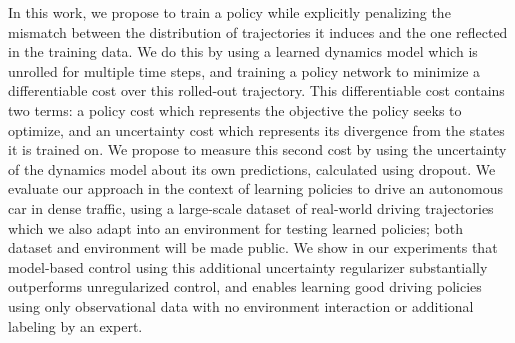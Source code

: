 \documentclass{article} %
\begin{document}
In this work, we propose to train a policy while explicitly penalizing the mismatch between the distribution of trajectories it induces and the one reflected in the training data.
We do this by using a learned dynamics model which is unrolled for multiple time steps, and training a policy network to minimize a differentiable cost over this rolled-out trajectory.
This differentiable cost contains two terms: a policy cost which represents the objective the policy seeks to optimize, and an uncertainty cost which represents its divergence from the states it is trained on. 
We propose to measure this second cost by using the uncertainty of the dynamics model about its own predictions, calculated using dropout.
We evaluate our approach in the context of learning policies to drive an autonomous car in dense traffic, using a large-scale dataset of real-world driving trajectories which we also adapt into an environment for testing learned policies; both dataset and environment will be made public.
We show in our experiments that model-based control using this additional uncertainty regularizer substantially outperforms unregularized control, and enables learning good driving policies using only observational data with no environment interaction or additional labeling by an expert.
\end{document}
